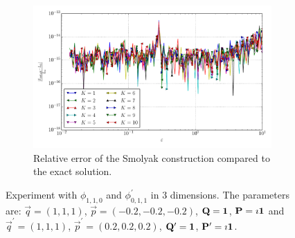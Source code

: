\documentclass[a4paper,10pt]{article}
\begin{document}
\begin{figure}[ht!]
\begin{subfigure}[t]{0.5\linewidth}
    \includegraphics[width=\linewidth]{./plots/tp_sg_3d_conv_eps_(1,1,0)_(0,1,1)_err_rel_nsd_gk.pdf}
    \caption{Relative error of the Smolyak construction compared to the exact solution.}
    \label{fig:tp_sg_3d_conv_p_110_011_err_rel_nsd_gk}
  \end{subfigure}
  \label{fig:tp_sg_3d_conv_p_110_011}
  \caption{Experiment with $\phi_{1,1,0}$ and $\phi_{0,1,1}^{\prime}$
  in 3 dimensions.
  The parameters are:
  $\vec{q} = (1, 1, 1)$,
  $\vec{p} = (-0.2, -0.2, -0.2)$,
  $\mathbf{Q} = \mathbf{1}$,
  $\mathbf{P} = \imath \mathbf{1}$
  and
  $\vec{q}^\prime = (1, 1, 1)$,
  $\vec{p}^\prime = (0.2, 0.2, 0.2)$,
  $\mathbf{Q}^\prime = \mathbf{1}$,
  $\mathbf{P}^\prime = \imath \mathbf{1}$.}
\end{figure}
\end{document}
